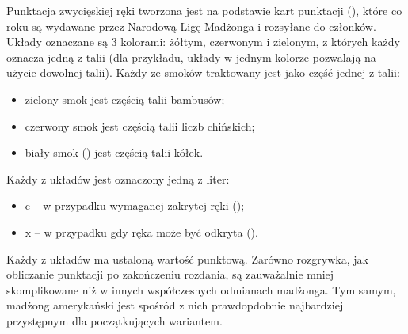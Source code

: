 Punktacja zwycięskiej ręki tworzona jest na podstawie kart punktacji
(), które co roku są wydawane przez Narodową Ligę
Madżonga i rozsyłane do członków. Układy oznaczane są 3 kolorami: żółtym,
czerwonym i zielonym, z których każdy oznacza jedną z talii (dla
przykładu, układy w jednym kolorze pozwalają na użycie dowolnej talii). Każdy ze
smoków traktowany jest jako część jednej z talii:
\begin{itemize}
  \item zielony smok jest częścią talii bambusów;
  \item czerwony smok jest częścią talii liczb chińskich;
  \item biały smok () jest częścią talii kółek.
\end{itemize}
Każdy z układów jest oznaczony jedną z liter:
\begin{itemize}
  \item c -- w przypadku wymaganej zakrytej ręki ();
  \item x -- w przypadku gdy ręka może być odkryta ().
\end{itemize}
Każdy z układów ma ustaloną wartość punktową. 
Zarówno rozgrywka, jak obliczanie punktacji po zakończeniu rozdania, są
zauważalnie mniej skomplikowane niż w innych współczesnych odmianach madżonga.
Tym samym, madżong amerykański jest spośród z nich prawdopdobnie najbardziej
przystępnym dla początkujących wariantem.


